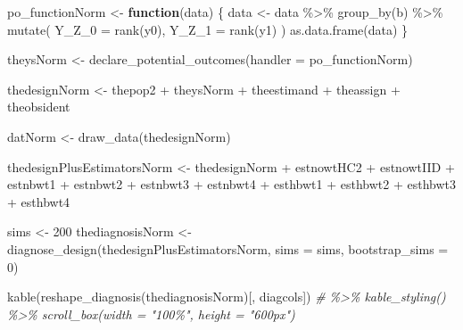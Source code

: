 \documentclass[
  12pt,
]{book}
\newenvironment{Shaded}{\begin{snugshade}}{\end{snugshade}}
\newcommand{\AttributeTok}[1]{\textcolor[rgb]{0.77,0.63,0.00}{#1}}
\newcommand{\CommentTok}[1]{\textcolor[rgb]{0.56,0.35,0.01}{\textit{#1}}}
\newcommand{\ControlFlowTok}[1]{\textcolor[rgb]{0.13,0.29,0.53}{\textbf{#1}}}
\newcommand{\DecValTok}[1]{\textcolor[rgb]{0.00,0.00,0.81}{#1}}
\newcommand{\FunctionTok}[1]{\textcolor[rgb]{0.00,0.00,0.00}{#1}}
\newcommand{\NormalTok}[1]{#1}
\newcommand{\OtherTok}[1]{\textcolor[rgb]{0.56,0.35,0.01}{#1}}
\newcommand{\SpecialCharTok}[1]{\textcolor[rgb]{0.00,0.00,0.00}{#1}}
\theoremstyle{definition}
\theoremstyle{definition}
\theoremstyle{definition}
\theoremstyle{remark}
\begin{document}
\begin{Shaded}
\begin{Highlighting}[]
\NormalTok{po\_functionNorm }\OtherTok{\textless{}{-}} \ControlFlowTok{function}\NormalTok{(data) \{}
\NormalTok{  data }\OtherTok{\textless{}{-}}\NormalTok{ data }\SpecialCharTok{\%\textgreater{}\%}
    \FunctionTok{group\_by}\NormalTok{(b) }\SpecialCharTok{\%\textgreater{}\%}
    \FunctionTok{mutate}\NormalTok{(}
      \AttributeTok{Y\_Z\_0 =} \FunctionTok{rank}\NormalTok{(y0),}
      \AttributeTok{Y\_Z\_1 =} \FunctionTok{rank}\NormalTok{(y1)}
\NormalTok{    )}
  \FunctionTok{as.data.frame}\NormalTok{(data)}
\NormalTok{\}}

\NormalTok{theysNorm }\OtherTok{\textless{}{-}} \FunctionTok{declare\_potential\_outcomes}\NormalTok{(}\AttributeTok{handler =}\NormalTok{ po\_functionNorm)}

\NormalTok{thedesignNorm }\OtherTok{\textless{}{-}}\NormalTok{ thepop2 }\SpecialCharTok{+}\NormalTok{ theysNorm }\SpecialCharTok{+}\NormalTok{ theestimand }\SpecialCharTok{+}\NormalTok{ theassign }\SpecialCharTok{+}\NormalTok{ theobsident}

\NormalTok{datNorm }\OtherTok{\textless{}{-}} \FunctionTok{draw\_data}\NormalTok{(thedesignNorm)}

\NormalTok{thedesignPlusEstimatorsNorm }\OtherTok{\textless{}{-}}\NormalTok{ thedesignNorm }\SpecialCharTok{+}
\NormalTok{  estnowtHC2 }\SpecialCharTok{+}\NormalTok{ estnowtIID }\SpecialCharTok{+}\NormalTok{ estnbwt1 }\SpecialCharTok{+}\NormalTok{ estnbwt2 }\SpecialCharTok{+}\NormalTok{ estnbwt3 }\SpecialCharTok{+}\NormalTok{ estnbwt4 }\SpecialCharTok{+}
\NormalTok{  esthbwt1 }\SpecialCharTok{+}\NormalTok{ esthbwt2 }\SpecialCharTok{+}\NormalTok{ esthbwt3 }\SpecialCharTok{+}\NormalTok{ esthbwt4}
\end{Highlighting}
\end{Shaded}

\begin{Shaded}
\begin{Highlighting}[]
\NormalTok{sims }\OtherTok{\textless{}{-}} \DecValTok{200}
\NormalTok{thediagnosisNorm }\OtherTok{\textless{}{-}} \FunctionTok{diagnose\_design}\NormalTok{(thedesignPlusEstimatorsNorm, }\AttributeTok{sims =}\NormalTok{ sims, }\AttributeTok{bootstrap\_sims =} \DecValTok{0}\NormalTok{)}
\end{Highlighting}
\end{Shaded}

\begin{Shaded}
\begin{Highlighting}[]
\FunctionTok{kable}\NormalTok{(}\FunctionTok{reshape\_diagnosis}\NormalTok{(thediagnosisNorm)[, diagcols]) }\CommentTok{\# \%\textgreater{}\% kable\_styling() \%\textgreater{}\% scroll\_box(width = "100\%", height = "600px")}
\end{Highlighting}
\end{Shaded}
\end{document}
